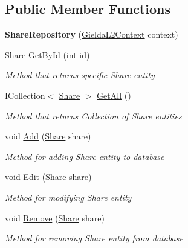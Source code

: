 \subsection*{Public Member Functions}
\begin{DoxyCompactItemize}
\item 
\mbox{\label{class_gielda_l2_1_1_i_n_f_r_a_s_t_r_u_c_t_u_r_e_1_1_repositories_1_1_share_repository_ad2fa3231e118e3fb79dc917aefcdc31c}} 
{\bfseries Share\+Repository} (\mbox{\hyperlink{class_gielda_l2_1_1_d_b_1_1_gielda_l2_context}{Gielda\+L2\+Context}} context)
\item 
\mbox{\hyperlink{class_gielda_l2_1_1_d_b_1_1_entities_1_1_share}{Share}} \mbox{\hyperlink{class_gielda_l2_1_1_i_n_f_r_a_s_t_r_u_c_t_u_r_e_1_1_repositories_1_1_share_repository_ac034dd25c3630f8641baf9e7eafe94db}{Get\+By\+Id}} (int id)
\begin{DoxyCompactList}\small\item\em Method that returns specific Share entity \end{DoxyCompactList}\item 
I\+Collection$<$ \mbox{\hyperlink{class_gielda_l2_1_1_d_b_1_1_entities_1_1_share}{Share}} $>$ \mbox{\hyperlink{class_gielda_l2_1_1_i_n_f_r_a_s_t_r_u_c_t_u_r_e_1_1_repositories_1_1_share_repository_aef8271595f290092d8b99d4789c8f37c}{Get\+All}} ()
\begin{DoxyCompactList}\small\item\em Method that returns Collection of Share entities \end{DoxyCompactList}\item 
void \mbox{\hyperlink{class_gielda_l2_1_1_i_n_f_r_a_s_t_r_u_c_t_u_r_e_1_1_repositories_1_1_share_repository_ab72f6f527449750b41956b564c892a7c}{Add}} (\mbox{\hyperlink{class_gielda_l2_1_1_d_b_1_1_entities_1_1_share}{Share}} share)
\begin{DoxyCompactList}\small\item\em Method for adding Share entity to database \end{DoxyCompactList}\item 
void \mbox{\hyperlink{class_gielda_l2_1_1_i_n_f_r_a_s_t_r_u_c_t_u_r_e_1_1_repositories_1_1_share_repository_ac3b39b1ed8794698ad74054688667e6a}{Edit}} (\mbox{\hyperlink{class_gielda_l2_1_1_d_b_1_1_entities_1_1_share}{Share}} share)
\begin{DoxyCompactList}\small\item\em Method for modifying Share entity \end{DoxyCompactList}\item 
void \mbox{\hyperlink{class_gielda_l2_1_1_i_n_f_r_a_s_t_r_u_c_t_u_r_e_1_1_repositories_1_1_share_repository_a76ee0cf8f78b19983167a3bcdff4e405}{Remove}} (\mbox{\hyperlink{class_gielda_l2_1_1_d_b_1_1_entities_1_1_share}{Share}} share)
\begin{DoxyCompactList}\small\item\em Method for removing Share entity from database \end{DoxyCompactList}\end{DoxyCompactItemize}

